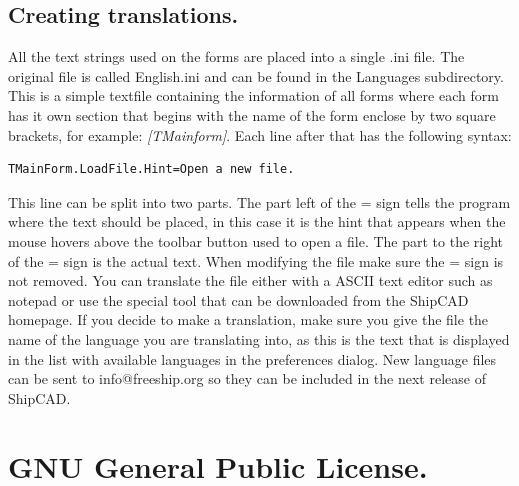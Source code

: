 \documentclass[12pt]{article}
\begin{document}
\subsection{Creating translations.}
All the text strings used on the forms are placed into a single .ini
file. The original file is called English.ini and can be found in the
Languages subdirectory. This is a simple textfile containing the
information of all forms where each form has it own section that
begins with the name of the form enclose by two square brackets, for
example: \textit{[TMainform]}. Each line after that has the following syntax:
\begin{verbatim}
TMainForm.LoadFile.Hint=Open a new file.
\end{verbatim}
This line can be split into two parts. The part left of the = sign
tells the program where the text should be placed, in this case it is
the hint that appears when the mouse hovers above the toolbar button
used to open a file. The part to the right of the = sign is the actual
text. When modifying the file make sure the = sign is not removed. You
can translate the file either with a ASCII text editor such as notepad
or use the special tool that can be downloaded from the ShipCAD
homepage. If you decide to make a translation, make sure you give the
file the name of the language you are translating into, as this is the
text that is displayed in the list with available languages in the
preferences dialog. New language files can be sent to
info@freeship.org so they can be included in the next release of
ShipCAD.

\pagebreak

\section{GNU General Public License.}
\end{document}

